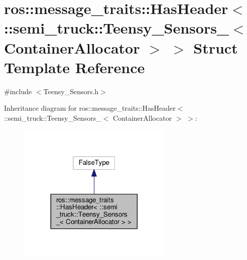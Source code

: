 \hypertarget{structros_1_1message__traits_1_1_has_header_3_01_1_1semi__truck_1_1_teensy___sensors___3_01_container_allocator_01_4_01_4}{}\section{ros\+:\+:message\+\_\+traits\+:\+:Has\+Header$<$ \+:\+:semi\+\_\+truck\+:\+:Teensy\+\_\+\+Sensors\+\_\+$<$ Container\+Allocator $>$ $>$ Struct Template Reference}
\label{structros_1_1message__traits_1_1_has_header_3_01_1_1semi__truck_1_1_teensy___sensors___3_01_container_allocator_01_4_01_4}


{\ttfamily \#include $<$Teensy\+\_\+\+Sensors.\+h$>$}



Inheritance diagram for ros\+:\+:message\+\_\+traits\+:\+:Has\+Header$<$ \+:\+:semi\+\_\+truck\+:\+:Teensy\+\_\+\+Sensors\+\_\+$<$ Container\+Allocator $>$ $>$\+:\nopagebreak
\begin{figure}[H]
\begin{center}
\leavevmode
\includegraphics[width=209pt]{structros_1_1message__traits_1_1_has_header_3_01_1_1semi__truck_1_1_teensy___sensors___3_01_cont8409c41542eae9da2f6e341cda4ed823}
\end{center}
\end{figure}


